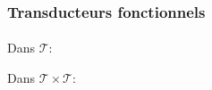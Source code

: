 \frametitle{Transducteurs fonctionnels}
\framesubtitle{}

Dans $\mathscr{T}$:
	

Dans $\mathscr{T} \times \mathscr{T}$:
	